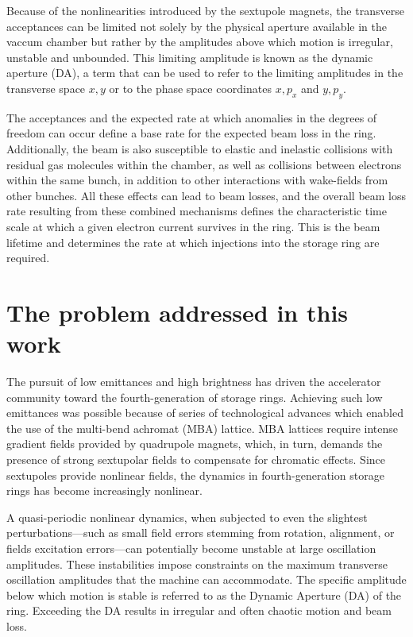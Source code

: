 Because of the nonlinearities introduced by the sextupole magnets, the transverse acceptances can be limited not solely by the physical aperture available in the vaccum chamber but rather by the amplitudes above which motion is irregular, unstable and unbounded. This limiting amplitude is known as the dynamic aperture (DA), a term that can be used to refer to the limiting amplitudes in the transverse space $x,y$ or to the phase space coordinates $x, p_x$ and $y, p_y$.

The acceptances and the expected rate at which anomalies in the degrees of freedom can occur define a base rate for the expected beam loss in the ring. Additionally, the beam is also susceptible to elastic and inelastic collisions with residual gas molecules within the chamber, as well as collisions between electrons within the same bunch, in addition to other interactions with wake-fields  from other bunches. All these effects can lead to beam losses, and the overall beam loss rate resulting from these combined mechanisms defines the characteristic time scale at which a given electron current survives in the ring. This is the beam lifetime and determines the rate at which injections into the storage ring are required.

\section{The problem addressed in this work}
The pursuit of low emittances and high brightness has driven the accelerator community toward the fourth-generation of storage rings. Achieving such low emittances was possible because of series of technological advances which enabled the use of the multi-bend achromat (MBA) lattice\cite{liu_towards_2017,hettel_challenges_2014}. MBA lattices require intense gradient fields provided by quadrupole magnets, which, in turn, demands the presence of strong sextupolar fields to compensate for chromatic effects. Since sextupoles provide nonlinear fields, the dynamics in fourth-generation storage rings has become increasingly nonlinear\cite{liu_towards_2017}.

A quasi-periodic nonlinear dynamics, when subjected to even the slightest perturbations—such as small field errors stemming from rotation, alignment, or fields excitation errors—can potentially become unstable at large oscillation amplitudes. These instabilities impose constraints on the maximum transverse oscillation amplitudes that the machine can accommodate. The specific amplitude below which motion is stable is referred to as the Dynamic Aperture (DA) of the ring. Exceeding the DA results in irregular and often chaotic motion and beam loss.

